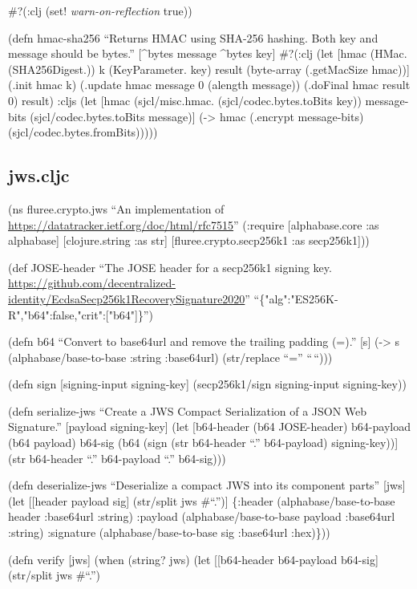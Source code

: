 \documentclass[
]{article}
\begin{document}
\#?(:clj (set! \emph{warn-on-reflection} true))

(defn hmac-sha256 ``Returns HMAC using SHA-256 hashing. Both key and
message should be bytes.'' {[}\^{}bytes message \^{}bytes key{]}
\#?(:clj (let {[}hmac (HMac. (SHA256Digest.)) k (KeyParameter. key)
result (byte-array (.getMacSize hmac)){]} (.init hmac k) (.update hmac
message 0 (alength message)) (.doFinal hmac result 0) result) :cljs (let
{[}hmac (sjcl/misc.hmac. (sjcl/codec.bytes.toBits key)) message-bits
(sjcl/codec.bytes.toBits message){]} (-\textgreater{} hmac (.encrypt
message-bits) (sjcl/codec.bytes.fromBits)))))

\subsection{jws.cljc}\label{jws.cljc}

(ns fluree.crypto.jws ``An implementation of
\url{https://datatracker.ietf.org/doc/html/rfc7515}'' (:require
{[}alphabase.core :as alphabase{]} {[}clojure.string :as str{]}
{[}fluree.crypto.secp256k1 :as secp256k1{]}))

(def JOSE-header ``The JOSE header for a secp256k1 signing key.
\url{https://github.com/decentralized-identity/EcdsaSecp256k1RecoverySignature2020}''
``\{"alg":"ES256K-R","b64":false,"crit":{[}"b64"{]}\}'')

(defn b64 ``Convert to base64url and remove the trailing padding (=).''
{[}s{]} (-\textgreater{} s (alphabase/base-to-base :string :base64url)
(str/replace ``='' ``\,``)))

(defn sign {[}signing-input signing-key{]} (secp256k1/sign signing-input
signing-key))

(defn serialize-jws ``Create a JWS Compact Serialization of a JSON Web
Signature.'' {[}payload signing-key{]} (let {[}b64-header (b64
JOSE-header) b64-payload (b64 payload) b64-sig (b64 (sign (str
b64-header ``.'' b64-payload) signing-key)){]} (str b64-header ``.''
b64-payload ``.'' b64-sig)))

(defn deserialize-jws ``Deserialize a compact JWS into its component
parts'' {[}jws{]} (let {[}{[}header payload sig{]} (str/split jws
\#``.''){]} \{:header (alphabase/base-to-base header :base64url :string)
:payload (alphabase/base-to-base payload :base64url :string) :signature
(alphabase/base-to-base sig :base64url :hex)\}))

(defn verify {[}jws{]} (when (string? jws) (let {[}{[}b64-header
b64-payload b64-sig{]} (str/split jws \#``.'')
\end{document}

